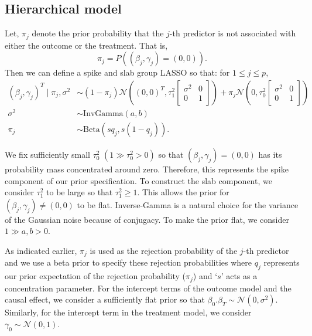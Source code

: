 \documentclass{amsart}
\newcommand{\normal}{\mathcal{N}}
\begin{document}
\subsection{Hierarchical model}

Let, $\pi_j$ denote the prior probability that the $j$-th
predictor is not associated with either the outcome or the 
treatment. That is, 
\begin{equation}
	\pi_j = P\left((\beta_j,\gamma_j)=(0,0)\right).
\end{equation}
Then we can define a spike and slab group LASSO so that:
for $1\le j\le p$,
\begin{align}
(\beta_j,\gamma_j)^T \mid \pi_{j}, \sigma^2 &\sim 
(1-\pi_{j})\normal\left( (0,0)^T, 
\tau_1^2\begin{bmatrix}
\sigma^2 & 0 \\
0 & 1
\end{bmatrix}\right)
+ \pi_{j} \normal\left(0, 
\tau_0^2\begin{bmatrix}
\sigma^2 & 0 \\
0 & 1
\end{bmatrix}\right)\\
\sigma^2&\sim \text{InvGamma}(a, b)\\
\pi_{j} &\sim\text{Beta}\left(sq_j, s(1-q_j)\right).
\end{align}

We fix sufficiently small $\tau^2_0$
$(1\gg\tau_0^2>0)$ so that  $(\beta_j, \gamma_j) = (0,0)$ has its probability mass 
concentrated around zero. Therefore, this represents the spike component of our prior specification. 
To construct the slab component, we consider $\tau_1^2$ to be large so that $\tau_1^2\ge 1$. This allows the prior for $(\beta_j, \gamma_j)\not=(0,0)$ to be flat. Inverse-Gamma is a natural choice
for the variance of the Gaussian noise because of conjugacy. To
make the prior flat, we consider $1\gg a, b >0$.

As indicated earlier, $\pi_j$ is used as the rejection probability
of the $j$-th predictor and we use a beta prior to specify 
these rejection probabilities where  $q_j$ represents our prior expectation of the rejection probability ($\pi_j$) and `$s$' acts as 
a concentration parameter.
For the intercept terms of the outcome model and the causal effect, 
we consider a sufficiently flat prior so that 
$\beta_0. \beta_T\sim \normal(0,\sigma^2)$. Similarly, for the
intercept term in the treatment model, we consider 
$\gamma_0\sim \normal(0,1)$. 
\end{document}

